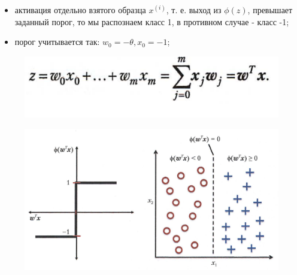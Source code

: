 \documentclass{beamer}
\begin{document}
\begin{frame}[t]
\begin{itemize}
\item активация отдельно взятого образца $x^{(i)}$, т. е. выход из $\phi(z)$, превышает заданный порог, то мы распознаем класс 1, в противном случае - класс -1;
\item порог учитывается так: $w_0 = -\theta, x_0 = -1$;
\end{itemize}
\begin{figure}[h]
\centering
\includegraphics[scale=0.4]{images/lec03-pic04.png}
\end{figure}
\begin{figure}[h]
\centering
\includegraphics[scale=0.25]{images/lec03-pic05.png}
\end{figure}
\end{frame}
\end{document}

